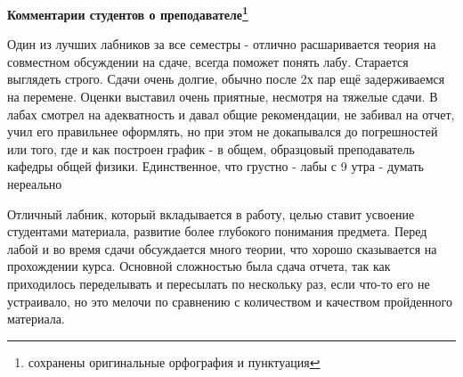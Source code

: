             \textbf{Комментарии студентов о преподавателе\protect\footnote{сохранены оригинальные орфография и пунктуация}}
                \begin{commentbox} 
                    Один из лучших лабников за все семестры - отлично расшаривается теория на совместном обсуждении на сдаче, всегда поможет понять лабу. Старается выглядеть строго. Сдачи очень долгие, обычно после 2х пар ещё задерживаемся на перемене. Оценки выставил очень приятные, несмотря на тяжелые сдачи. В лабах смотрел на адекватность и давал общие рекомендации, не забивал на отчет, учил его правильнее оформлять, но при этом не докапывался до погрешностей или того, где и как построен график - в общем, образцовый преподаватель кафедры общей физики. Единственное, что грустно - лабы с 9 утра - думать нереально  
                \end{commentbox} 
            
                \begin{commentbox} 
                    Отличный лабник, который вкладывается в работу, целью ставит усвоение студентами материала, развитие более глубокого понимания предмета. Перед лабой и во время сдачи обсуждается много теории, что хорошо сказывается на прохождении курса. Основной сложностью была сдача отчета, так как приходилось переделывать и пересылать по нескольку раз, если что-то его не устраивало, но это мелочи по сравнению с количеством и качеством пройденного материала. 
                \end{commentbox} 


